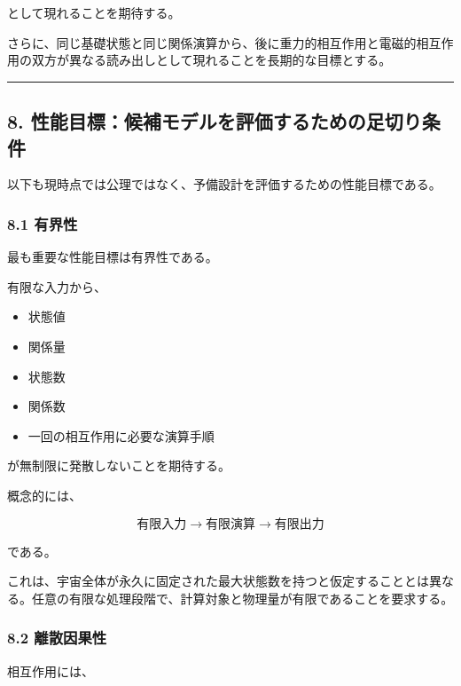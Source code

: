 \documentclass[
  a4paper,
]{ltjsarticle}
\providecommand{\tightlist}{%
  \setlength{\itemsep}{0pt}\setlength{\parskip}{0pt}}
\begin{document}
として現れることを期待する。

さらに、同じ基礎状態と同じ関係演算から、後に重力的相互作用と電磁的相互作用の双方が異なる読み出しとして現れることを長期的な目標とする。

\begin{center}\rule{0.5\linewidth}{0.5pt}\end{center}

\subsection{8.
性能目標：候補モデルを評価するための足切り条件}\label{ux6027ux80fdux76eeux6a19ux5019ux88dcux30e2ux30c7ux30ebux3092ux8a55ux4fa1ux3059ux308bux305fux3081ux306eux8db3ux5207ux308aux6761ux4ef6}

以下も現時点では公理ではなく、予備設計を評価するための性能目標である。

\subsubsection{8.1 有界性}\label{ux6709ux754cux6027}

最も重要な性能目標は有界性である。

有限な入力から、

\begin{itemize}
\tightlist
\item
  状態値
\item
  関係量
\item
  状態数
\item
  関係数
\item
  一回の相互作用に必要な演算手順
\end{itemize}

が無制限に発散しないことを期待する。

概念的には、

\[
\boxed{
\text{有限入力}
\rightarrow
\text{有限演算}
\rightarrow
\text{有限出力}
}
\]

である。

これは、宇宙全体が永久に固定された最大状態数を持つと仮定することとは異なる。任意の有限な処理段階で、計算対象と物理量が有限であることを要求する。

\subsubsection{8.2 離散因果性}\label{ux96e2ux6563ux56e0ux679cux6027}

相互作用には、
\end{document}
